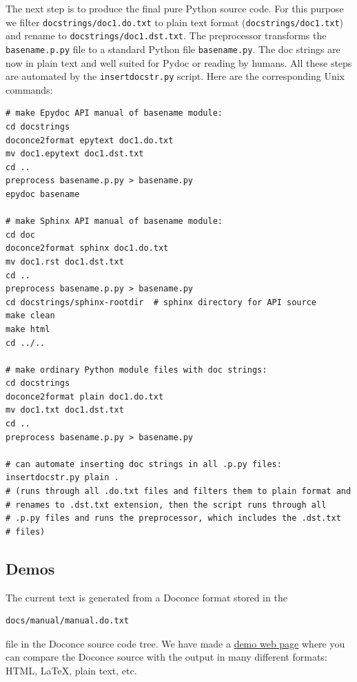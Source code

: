\documentclass{article}
\begin{document}
The next step is to produce the final pure Python source code. For
this purpose we filter {\fontsize{10pt}{10pt}\verb!docstrings/doc1.do.txt!} to plain text format
({\fontsize{10pt}{10pt}\verb!docstrings/doc1.txt!}) and rename to {\fontsize{10pt}{10pt}\verb!docstrings/doc1.dst.txt!}. The
preprocessor transforms the {\fontsize{10pt}{10pt}\verb!basename.p.py!} file to a standard Python
file {\fontsize{10pt}{10pt}\verb!basename.py!}. The doc strings are now in plain text and well
suited for Pydoc or reading by humans. All these steps are automated
by the {\fontsize{10pt}{10pt}\verb!insertdocstr.py!} script.  Here are the corresponding Unix
commands:
\begin{Verbatim}[fontsize=\fontsize{9pt}{9pt},tabsize=8,baselinestretch=0.85,
fontfamily=tt,xleftmargin=7mm]
# make Epydoc API manual of basename module:
cd docstrings
doconce2format epytext doc1.do.txt
mv doc1.epytext doc1.dst.txt
cd ..
preprocess basename.p.py > basename.py
epydoc basename

# make Sphinx API manual of basename module:
cd doc
doconce2format sphinx doc1.do.txt
mv doc1.rst doc1.dst.txt
cd ..
preprocess basename.p.py > basename.py
cd docstrings/sphinx-rootdir  # sphinx directory for API source
make clean
make html
cd ../..

# make ordinary Python module files with doc strings:
cd docstrings
doconce2format plain doc1.do.txt
mv doc1.txt doc1.dst.txt
cd ..
preprocess basename.p.py > basename.py

# can automate inserting doc strings in all .p.py files:
insertdocstr.py plain .
# (runs through all .do.txt files and filters them to plain format and
# renames to .dst.txt extension, then the script runs through all 
# .p.py files and runs the preprocessor, which includes the .dst.txt
# files)
\end{Verbatim}
\noindent


% 
% 
% 
% 
% 
% 

\subsection{Demos}


The current text is generated from a Doconce format stored in the
\begin{Verbatim}[fontsize=\fontsize{9pt}{9pt},tabsize=8,baselinestretch=0.85,
fontfamily=tt,xleftmargin=7mm]
docs/manual/manual.do.txt
\end{Verbatim}
\noindent
file in the Doconce source code tree. We have made a 
\href{https://doconce.googlecode.com/hg/trunk/docs/demos/manual/index.html}{demo web page}
where you can compare the Doconce source with the output in many
different formats: HTML, {\LaTeX}, plain text, etc.
\end{document}
